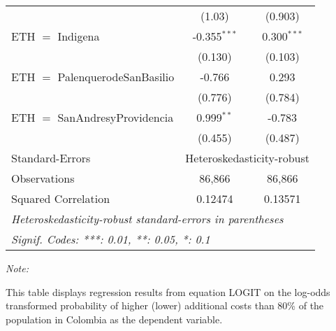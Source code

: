 \begin{table}[htbp!]
\begin{adjustbox}{width = 1\textwidth, max height = 0.95\textheight, center}
\begin{threeparttable}[b]
\begin{tabular}{lcc}
                                           & (1.03)         & (0.903)\\   
            ETH $=$ Indigena               & -0.355$^{***}$ & 0.300$^{***}$\\   
                                           & (0.130)        & (0.103)\\   
            ETH $=$ PalenquerodeSanBasilio & -0.766         & 0.293\\   
                                           & (0.776)        & (0.784)\\   
            ETH $=$ SanAndresyProvidencia  & 0.999$^{**}$   & -0.783\\   
                                           & (0.455)        & (0.487)\\   
            \midrule 
            Standard-Errors & \multicolumn{2}{c}{Heteroskedasticity-robust} \\ 
            Observations                   & 86,866         & 86,866\\  
            Squared Correlation            & 0.12474        & 0.13571\\  
            \midrule \midrule
            \multicolumn{3}{l}{\emph{Heteroskedasticity-robust standard-errors in parentheses}}\\
            \multicolumn{3}{l}{\emph{Signif. Codes: ***: 0.01, **: 0.05, *: 0.1}}\\
         \end{tabular}
         
         \begin{tablenotes}\item \medskip \textit{Note:}
            \item This table displays regression results from equation LOGIT on the log-odds transformed probability of higher (lower) additional costs than 80\% of the population in Colombia as the dependent variable. 
         \end{tablenotes}
      \end{threeparttable}
   \end{adjustbox}
\end{table}


